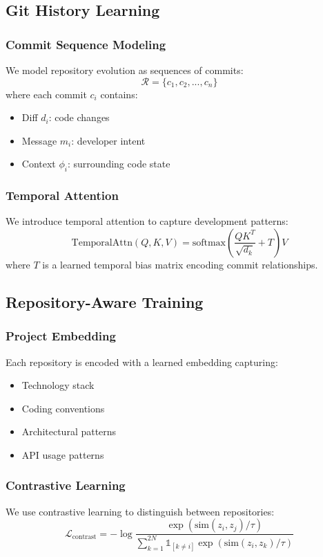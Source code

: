 \documentclass[11pt,a4paper]{article}
\begin{document}
\subsection{Git History Learning}

\subsubsection{Commit Sequence Modeling}
We model repository evolution as sequences of commits:
\begin{equation}
    \mathcal{R} = \{c_1, c_2, ..., c_n\}
\end{equation}
where each commit $c_i$ contains:
\begin{itemize}
    \item Diff $d_i$: code changes
    \item Message $m_i$: developer intent
    \item Context $\phi_i$: surrounding code state
\end{itemize}

\subsubsection{Temporal Attention}
We introduce temporal attention to capture development patterns:
\begin{equation}
    \text{TemporalAttn}(Q, K, V) = \text{softmax}\left(\frac{QK^T}{\sqrt{d_k}} + T\right)V
\end{equation}
where $T$ is a learned temporal bias matrix encoding commit relationships.

\subsection{Repository-Aware Training}

\subsubsection{Project Embedding}
Each repository is encoded with a learned embedding capturing:
\begin{itemize}
    \item Technology stack
    \item Coding conventions
    \item Architectural patterns
    \item API usage patterns
\end{itemize}

\subsubsection{Contrastive Learning}
We use contrastive learning to distinguish between repositories:
\begin{equation}
    \mathcal{L}_{\text{contrast}} = -\log \frac{\exp(\text{sim}(z_i, z_j) / \tau)}{\sum_{k=1}^{2N} \mathbb{1}_{[k \neq i]} \exp(\text{sim}(z_i, z_k) / \tau)}
\end{equation}
\end{document}
